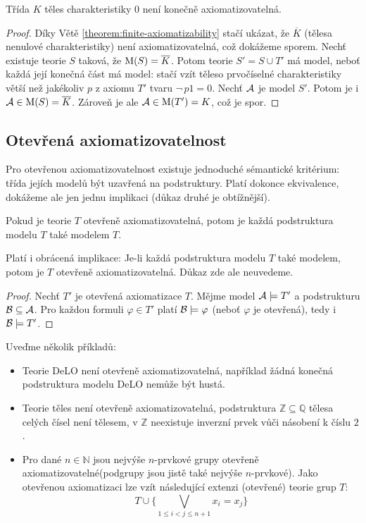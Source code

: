 \begin{proposition}
Třída $K$ těles charakteristiky $0$ není konečně axiomatizovatelná.   
\end{proposition}
\begin{proof}
Díky Větě \ref{theorem:finite-axiomatizability} stačí ukázat, že $\overline{K}$ (tělesa nenulové charakteristiky) není axiomatizovatelná, což dokážeme sporem. Nechť existuje teorie $S$ taková, že $\operatorname{M}(S)=\overline{K}$. Potom teorie 
$S'=S\cup T'$ má model, neboť každá její konečná část má model: stačí vzít těleso prvočíselné charakteristiky větší než jakékoliv $p$ z axiomu $T'$ tvaru $\neg\, p1=0$. Nechť $\mathcal{A}$ je model $S'$. Potom je i $\mathcal{A}\in\operatorname{M}(S)=\overline{K}$. Zároveň je ale $\mathcal{A}\in\operatorname{M}(T')=K$, což je spor.
\end{proof}

\subsection{Otevřená axiomatizovatelnost}

Pro otevřenou axiomatizovatelnost existuje jednoduché sémantické kritérium: třída jejích modelů být uzavřená na podstruktury. Platí dokonce ekvivalence, dokážeme ale jen jednu implikaci (důkaz druhé je obtížnější).

\begin{theorem}\label{theorem:open-axiomatizability}
Pokud je teorie $T$ otevřeně axiomatizovatelná, potom je každá podstruktura modelu $T$ také modelem $T$.   
\end{theorem}

\begin{remark}
    Platí i obrácená implikace: Je-li každá podstruktura modelu $T$ také modelem, potom je $T$ otevřeně axiomatizovatelná. Důkaz zde ale neuvedeme.
\end{remark}

\begin{proof}
Nechť $T'$ je otevřená axiomatizace $T$. Mějme model $\mathcal{A}\models T'$  a podstrukturu $\mathcal{B}\subseteq\mathcal{A}$. Pro každou formuli $\varphi\in T'$ platí $\mathcal{B}\models\varphi$ (neboť $\varphi$ je otevřená), tedy i $\mathcal{B}\models T'$.  
\end{proof}

\begin{example}
    Uveďme několik příkladů:
    \begin{itemize}
        \item Teorie DeLO není otevřeně axiomatizovatelná, například žádná konečná podstruktura modelu DeLO nemůže být hustá.
        \item Teorie těles není otevřeně axiomatizovatelná, podstruktura $\mathbb Z\subseteq\mathbb Q$ tělesa celých čísel není tělesem, v $\mathbb Z$ neexistuje inverzní prvek vůči násobení k číslu $2$.
        \item Pro dané $n\in\mathbb N$ jsou nejvýše $n$-prvkové grupy otevřeně axiomatizovatelné(podgrupy jsou jistě také nejvýše $n$-prvkové). Jako otevřenou axiomatizaci lze vzít následující extenzi (otevřené) teorie grup $T$:
        $$
        T\cup \{\bigvee_{1\leq i<j\leq n+1}x_i=x_j\}
        $$
    \end{itemize}
\end{example}
